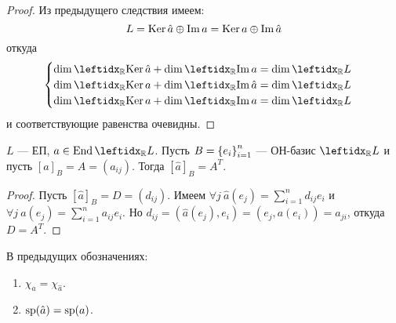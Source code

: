 \begin{proof}
    Из предыдущего следствия имеем: $$L = \operatorname{Ker} \hat{a} \oplus \operatorname{Im} a = \operatorname{Ker} a \oplus \operatorname{Im} \hat{a}$$
    откуда $$\begin{cases}
        \dim \lsub{\mathbb{R}}{\ker \hat{a}} + \dim \lsub{\mathbb{R}}{\im a} = \dim \lsub{\mathbb{R}}{L} \\
        \dim \lsub{\mathbb{R}}{\ker a} + \dim \lsub{\mathbb{R}}{\im \hat{a}} = \dim \lsub{\mathbb{R}}{L} \\
        \dim \lsub{\mathbb{R}}{\ker a} + \dim \lsub{\mathbb{R}}{\im a} = \dim \lsub{\mathbb{R}}{L}
    \end{cases}$$
    и соответствующие равенства очевидны.
\end{proof}

\begin{thm}
    $L$ --- ЕП, $a \in \End \lsub{\mathbb{R}}{L}$. Пусть $B = \left\{e_i\right\}_{i=1}^{n}$ --- ОН-базис $\lsub{\mathbb{R}}{L}$ и пусть $[a]_B = A = (a_{ij})$. Тогда $[\hat{a}]_B = A^T$.
\end{thm}

\begin{proof}
    Пусть $[\hat{a}]_B = D = (d_{ij})$. Имеем $\forall j\ \hat{a}(e_j) = \sum_{i=1}^n d_{ij} e_i$ и $\forall j\ a(e_j) = \sum_{i=1}^n a_{ij} e_i$. Но $d_{ij} = (\hat{a}(e_j), e_i) = (e_j, a(e_i)) = a_{ji}$, откуда $D = A^T$.
\end{proof}

\begin{cor*}
    В предыдущих обозначениях:
    \begin{enumerate}
        \item $\chi_a = \chi_{\hat{a}}$.
        \item $\operatorname{sp}(\hat{a}) = \operatorname{sp}(a)$.
    \end{enumerate}
\end{cor*}
